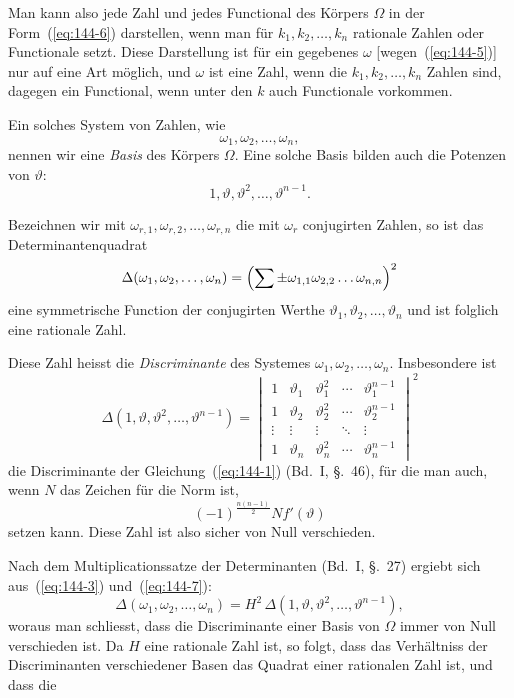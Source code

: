 \documentclass[12pt,a4paper]{article}
\theoremstyle{definition}
\begin{document}
Man kann also jede Zahl und jedes Functional des Körpers $\Omega$ in der Form~(\ref{eq:144-6}) darstellen, wenn man für $k_1,k_2,\dots,k_n$ rationale Zahlen oder Functionale setzt. Diese Darstellung ist für ein gegebenes $\omega$ [wegen~(\ref{eq:144-5})] nur auf eine Art möglich, und $\omega$ ist eine Zahl, wenn die $k_1,k_2,\dots,k_n$ Zahlen sind, dagegen ein Functional, wenn unter den $k$ auch Functionale vorkommen.

Ein solches System von Zahlen, wie
\[
\omega_1,\omega_2,\dots,\omega_n,
\]
nennen wir eine \emph{Basis} des Körpers $\Omega$. Eine solche Basis bilden auch die Potenzen von $\vartheta$:
\[
1,\vartheta,\vartheta^2,\dots,\vartheta^{n-1}.
\]

Bezeichnen wir mit $\omega_{r,1},\omega_{r,2},\dots,\omega_{r,n}$ die mit $\omega_r$ conjugirten Zahlen, so ist das Determinantenquadrat
\begin{equation}\label{eq:144-7}
\Delta(\omega_1,\omega_2,\dots,\omega_n)
= \Bigl(\sum \pm \omega_{1,1}\omega_{2,2}\dots\omega_{n,n}\Bigr)^2
\end{equation}
eine symmetrische Function der conjugirten Werthe $\vartheta_1,\vartheta_2,\dots,\vartheta_n$ und ist folglich eine rationale Zahl.

Diese Zahl heisst die \emph{Discriminante} des Systemes $\omega_1,\omega_2,\dots,\omega_n$. Insbesondere ist
\begin{equation}\label{eq:144-8}
\Delta(1,\vartheta,\vartheta^2,\dots,\vartheta^{n-1})
= \begin{vmatrix}
1 & \vartheta_1 & \vartheta_1^2 & \cdots & \vartheta_1^{n-1}\\
1 & \vartheta_2 & \vartheta_2^2 & \cdots & \vartheta_2^{n-1}\\
\vdots & \vdots & \vdots & \ddots & \vdots\\
1 & \vartheta_n & \vartheta_n^2 & \cdots & \vartheta_n^{n-1}
\end{vmatrix}^{\!\!2}
\end{equation}
die Discriminante der Gleichung~(\ref{eq:144-1}) (Bd.~I, \S.~46), für die man auch, wenn $N$ das Zeichen für die Norm ist,
\begin{equation}\label{eq:144-9}
(-1)^{\frac{n(n-1)}{2}} Nf'(\vartheta)
\end{equation}
setzen kann. Diese Zahl ist also sicher von Null verschieden.

Nach dem Multiplicationssatze der Determinanten (Bd.~I, \S.~27) ergiebt sich aus~(\ref{eq:144-3}) und~(\ref{eq:144-7}):
\begin{equation}\label{eq:144-10}
\Delta(\omega_1,\omega_2,\dots,\omega_n)
= H^2\,\Delta(1,\vartheta,\vartheta^2,\dots,\vartheta^{n-1}),
\end{equation}
woraus man schliesst, dass die Discriminante einer Basis von $\Omega$ immer von Null verschieden ist. Da $H$ eine rationale Zahl ist, so folgt, dass das Verhältniss der Discriminanten verschiedener Basen das Quadrat einer rationalen Zahl ist, und dass die

\end{document}
